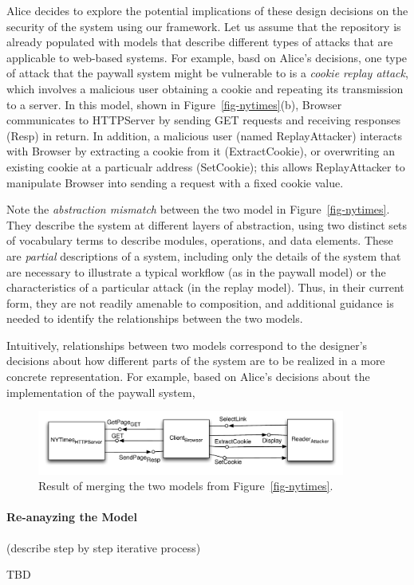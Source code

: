 Alice decides to explore the potential implications of these design
decisions on the security of the system using our framework. Let us
assume that the repository is already populated with models that
describe different types of attacks that are applicable to web-based
systems. For example, basd on Alice's decisions, one type of attack
that the paywall system might be vulnerable to is a \textit{cookie
  replay attack}, which involves a malicious user obtaining a cookie
and repeating its transmission to a server. In this model, shown in
Figure~\ref{fig-nytimes}(b), \textsf{Browser} communicates to
\textsf{HTTPServer} by sending \textsf{GET} requests and receiving
responses (\textsf{Resp}) in return. In addition, a malicious user
(named \textsf{ReplayAttacker}) interacts with \textsf{Browser} by
extracting a cookie from it (\textsf{ExtractCookie}), or overwriting
an existing cookie at a particualr address (\textsf{SetCookie}); this
allows \textsf{ReplayAttacker} to manipulate \textsf{Browser} into
sending a request with a fixed cookie value.

Note the \textit{abstraction mismatch} between the two model in
Figure~\ref{fig-nytimes}. They describe the system at different layers
of abstraction, using two distinct sets of vocabulary terms to
describe modules, operations, and data elements. These are
\textit{partial} descriptions of a system, including only the details
of the system that are necessary to illustrate a typical workflow (as
in the paywall model) or the characteristics of a particular attack
(in the replay model). Thus, in their current form, they are not
readily amenable to composition, and additional guidance is needed to
identify the relationships between the two models.

Intuitively, relationships between two models correspond to the
designer's decisions about how different parts of the system are to be
realized in a more concrete representation. For example, based on Alice's
decisions about the implementation of the paywall system, 

\begin{figure}[!t]
\centering
\includegraphics[width=0.9\textwidth]{diagrams/merged}
\caption{Result of merging the two models from Figure~\ref{fig-nytimes}.}
\label{fig-merged}
\end{figure}

\paragraph{\textbf{Re-anayzing the Model}}

(describe step by step iterative process)

TBD
